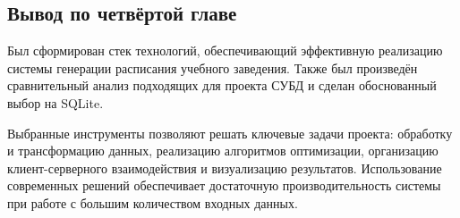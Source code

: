 \subsection{Вывод по четвёртой главе}

Был сформирован стек технологий, обеспечивающий эффективную реализацию системы генерации расписания учебного заведения. Также был произведён сравнительный анализ подходящих для проекта СУБД и сделан обоснованный выбор на SQLite.

Выбранные инструменты позволяют решать ключевые задачи проекта: обработку и трансформацию данных, реализацию алгоритмов оптимизации, организацию клиент-серверного взаимодействия и визуализацию результатов. Использование современных решений обеспечивает достаточную производительность системы при работе с большим количеством входных данных.
